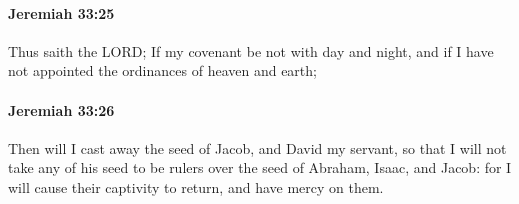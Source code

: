 		\paragraph{Jeremiah 33:25} %
			\label{JEREMIAH-33-25}

			Thus saith the LORD; If my covenant be not with day and night, and if I have not appointed the ordinances of heaven and earth;


		\paragraph{Jeremiah 33:26} %
			\label{JEREMIAH-33-26}

			Then will I cast away the seed of Jacob, and David my servant, so that I will not take any of his seed to be rulers over the seed of Abraham, Isaac, and Jacob: for I will cause their captivity to return, and have mercy on them.

